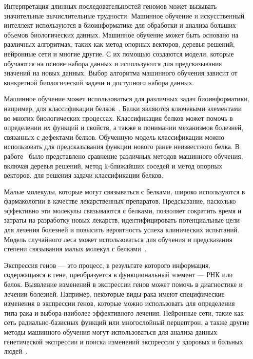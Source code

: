 
Интерпретация длинных последовательностей геномов может вызывать значительные вычислительные трудности.
Машинное обучение и искусственный интеллект используются в биоинформатике для обработки и анализа больших объемов биологических данных.
Машинное обучение может быть основано на различных алгоритмах, таких как метод опорных векторов, деревья решений, нейронные сети и многие другие.
С их помощью создаются модели, которые обучаются на основе набора данных и используются для предсказывания значений на новых данных.
Выбор алгоритма машинного обучения зависит от конкретной биологической задачи и доступного набора данных.

Машинное обучение может использоваться для различных задач биоинформатики, например, для классификации белков~\cite{diplaris2005protein}.
Белки являются ключевыми элементами во многих биологических процессах.
Классификация белков может помочь в определении их функций и свойств, а также в понимании механизмов болезней, связанных с дефектами белков.
Обученную модель классификации можно использовать для предсказывания функции нового ранее неизвестного белка.
В работе~\cite{diplaris2005protein} было представлено сравнение различных методов машинного обучения, включая деревья решений, метод k-ближайших соседей и метод опорных векторов, для решения задачи классификации белков.

Малые молекулы, которые могут связываться с белками, широко используются в фармакологии в качестве лекарственных препаратов.
Предсказание, насколько эффективно эти молекулы связываются с белками, позволяет сократить время и затраты на разработку новых лекарств, идентифицировать потенциальные цели для лечения болезней и повысить вероятность успеха клинических испытаний. 
Модель случайного леса может использоваться для обучения и предсказания степени связывания малых молекул с белками~\cite{ballester2010machine}.

Экспрессия генов --- это процесс, в результате которого информация, содержащаяся в гене, преобразуется в функциональный элемент --- РНК или белок. 
Выявление изменений в экспрессии генов может помочь в диагностике и лечении болезней.
Например, некоторые виды рака имеют специфические изменения в экспрессии генов, которые можно использовать для определения типа рака и выбора наиболее эффективного лечения.
Нейронные сети, такие как сеть радиально-базисных функций или многослойный перцептрон, а также другие методы машинного обучения могут использоваться для анализа данных генетической экспрессии и поиска изменений экспрессии у здоровых и больных людей~\cite{pirooznia2008comparative}.


